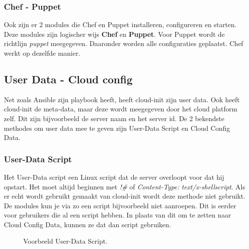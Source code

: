 \subsubsection{Chef - Puppet}
Ook zijn er 2 modules die Chef en Puppet installeren, configureren en starten. Deze modules zijn logischer wijs \textbf{Chef} en \textbf{Puppet}. Voor Puppet wordt de richtlijn \textit{puppet} meegegeven. Daaronder worden alle configuraties geplaatst. Chef werkt op dezelfde manier.

\subsection{User Data - Cloud config}
Net zoals Ansible zijn playbook heeft, heeft cloud-init zijn user data. Ook heeft cloud-init de meta-data, maar deze wordt meegegeven door het cloud platform zelf. Dit zijn bijvoorbeeld de server naam en het server id. De 2 bekendste methodes om user data mee te geven zijn User-Data Script en Cloud Config Data. 

\subsubsection{User-Data Script}
Het User-Data script een Linux script dat de server overloopt voor dat hij opstart. Het moet altijd beginnen met \textit{!\#} of \textit{Content-Type: text/x-shellscript}. Als er echt wordt gebruikt gemaakt van cloud-init wordt deze methode niet gebruikt. De modules kun je via zo een script bijvoorbeeld niet aanroepen. Dit is eerder voor gebruikers die al een script hebben. In plaats van dit om te zetten naar Cloud Config Data, kunnen ze dat dan script gebruiken.
\begin{figure}[!htb]
	\caption{Voorbeeld User-Data Script.}
	\label{fig:udatascript}
\end{figure}

